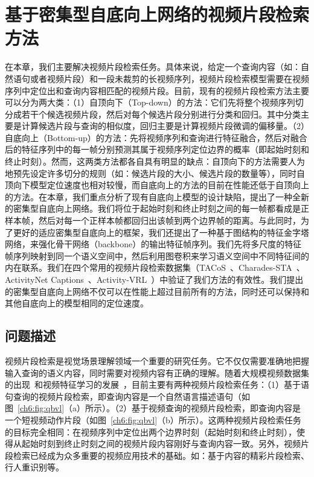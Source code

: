 \chapter{基于密集型自底向上网络的视频片段检索方法}

在本章，我们主要解决视频片段检索任务。具体来说，给定一个查询内容（如：自然语句或者视频片段）和一段未裁剪的长视频序列，视频片段检索模型需要在视频序列中定位出和查询内容相匹配的视频片段。目前，现有的视频片段检索方法主要可以分为两大类：（1）自顶向下（Top-down）的方法：它们先将整个视频序列切分成若干个候选视频片段，然后对每个候选片段分别进行分类和回归。其中分类主要是计算候选片段与查询的相似度，回归主要是计算视频片段微调的偏移量。（2）自底向上（Bottom-up）的方法：先将视频序列和查询进行特征融合，然后对融合后的特征序列中的每一帧分别预测其属于视频序列定位边界的概率（即起始时刻和终止时刻）。然而，这两类方法都各自具有明显的缺点：自顶向下的方法需要人为地预先设定许多切分的规则（如：候选片段的大小、候选片段的数量等），同时自顶向下模型定位速度也相对较慢，而自底向上的方法的目前在性能还低于自顶向上的方法。在本章，我们重点分析了现有自底向上模型的设计缺陷，提出了一种全新的密集型自底向上网络。我们将位于起始时刻和终止时刻之间的每一帧都看成是正样本帧，然后对每一个正样本帧都回归出该帧到两个边界帧的距离。与此同时，为了更好的适应密集型自底向上的框架，我们还提出了一种基于图结构的特征金字塔网络，来强化骨干网络（backbone）的输出特征帧序列。我们先将多尺度的特征帧序列映射到同一个语义空间中，然后利用图卷积来学习语义空间中不同特征间的内在联系。我们在四个常用的视频片段检索数据集（TACoS~\cite{regneri2013grounding}、Charades-STA~\cite{gao2017tall}、ActivityNet Captions~\cite{krishna2017dense}、Activity-VRL~\cite{feng2018video}）中验证了我们方法的有效性。我们提出的密集型自底向上网络不仅可以在性能上超过目前所有的方法，同时还可以保持和其他自底向上的模型相同的定位速度。
 

\section{问题描述}

视频片段检索是视觉场景理解领域一个重要的研究任务。它不仅仅需要准确地把握输入查询的语义内容，同时需要对视频内容有正确的理解。随着大规模视频数据集的出现~\cite{miech2019howto100m,monfort2018moments}和视频特征学习的发展~\cite{xu2019self}，目前主要有两种视频片段检索任务：（1）基于语句查询的视频片段检索，即查询内容是一个自然语言描述语句（如图~\ref{ch6:fig:qbvl}（a）所示）。（2）基于视频查询的视频片段检索，即查询内容是一个短视频动作片段（如图~\ref{ch6:fig:qbvl}（b）所示）。这两种视频片段检索任务的目标完全相同：在视频序列中定位出两个边界时刻（起始时刻和终止时刻），使得从起始时刻到终止时刻之间的视频片段内容刚好与查询内容一致。另外，视频片段检索已经成为众多重要的视频应用技术的基础。如：基于内容的精彩片段检索、行人重识别等。

